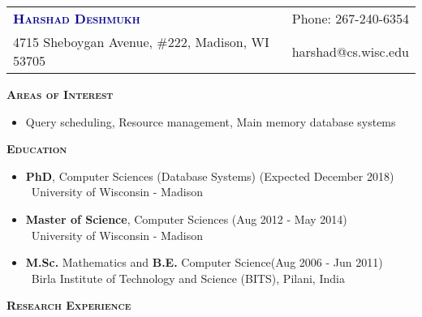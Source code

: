 \documentclass[11pt]{article}
\newcommand{\graybox}[1]{\begin{mdframed}[backgroundcolor=light-gray, linecolor=light-gray, roundcorner=10pt, shadow=false, shadowsize=1pt]
\Large{\textbf{\textsc{#1}}}
\end{mdframed}}
\begin{document}
\begin{flushleft}
\begin{tabular*}{\textwidth}{@{\extracolsep{\fill}}lr}%
{\LARGE{\textcolor{darkblue}{\textbf{\textsc{Harshad Deshmukh}}}}} & Phone: 267-240-6354\\
4715 Sheboygan Avenue, \#222, Madison, WI 53705 & harshad@cs.wisc.edu
\end{tabular*}
\end{flushleft}
\graybox{Areas of Interest}
\begin{itemize}\addtolength{\itemsep}{-0.5\baselineskip}
	\item[]Query scheduling, Resource management, Main memory database systems
\end{itemize}
\graybox{Education}
\begin{itemize}\addtolength{\itemsep}{-0.5\baselineskip}
\item{\textbf{PhD}, Computer Sciences (Database Systems) \hfill (Expected December 2018) }\\
	\textendash\ University of Wisconsin - Madison
\item{\textbf{Master of Science}, Computer Sciences \hfill (Aug 2012 - May 2014) }\\
	\textendash\ University of Wisconsin - Madison
\item{\textbf{M.Sc.} Mathematics and \textbf{B.E.} Computer Science\hfill (Aug 2006 - Jun 2011) }\\
	\textendash\ Birla Institute of Technology and Science (BITS), Pilani, India
\end{itemize}
\graybox{Research Experience}
\end{document}
